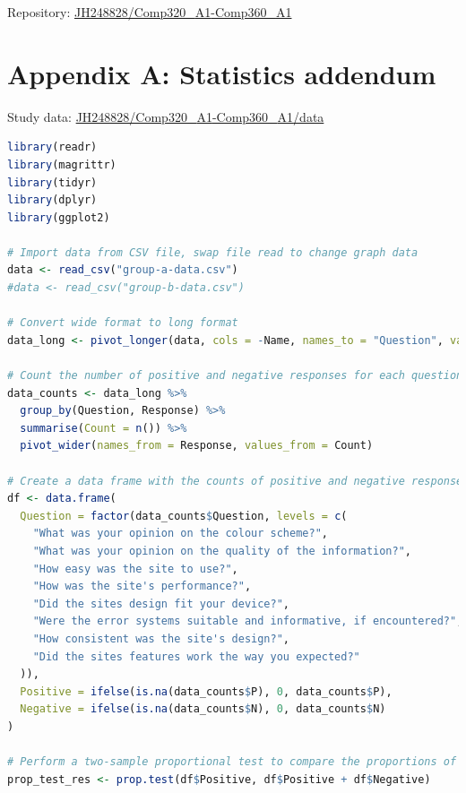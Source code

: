 \documentclass[article]{IEEEtran}
\begin{document}
    \appendix
        Repository: \href{https://github.falmouth.ac.uk/JH248828/Comp320_A1-Comp360_A1}{JH248828/Comp320\_{A1}-Comp360\_{A1}} \\

        \section*{Appendix A: Statistics addendum}
            \label{tab:study-data}
            Study data: \href{https://github.falmouth.ac.uk/JH248828/Comp320_A1-Comp360_A1/tree/documentation/data}{JH248828/Comp320\_{A1}-Comp360\_{A1}/data} \\
        
            \begin{lstlisting}[style=rListingStyle, language=R, caption={R-code used to create column graphs}, captionpos=t]
library(readr)
library(magrittr)
library(tidyr)
library(dplyr)
library(ggplot2)

# Import data from CSV file, swap file read to change graph data
data <- read_csv("group-a-data.csv")
#data <- read_csv("group-b-data.csv")

# Convert wide format to long format
data_long <- pivot_longer(data, cols = -Name, names_to = "Question", values_to = "Response")

# Count the number of positive and negative responses for each question
data_counts <- data_long %>%
  group_by(Question, Response) %>%
  summarise(Count = n()) %>%
  pivot_wider(names_from = Response, values_from = Count)

# Create a data frame with the counts of positive and negative responses for each question
df <- data.frame(
  Question = factor(data_counts$Question, levels = c(
    "What was your opinion on the colour scheme?",
    "What was your opinion on the quality of the information?",
    "How easy was the site to use?",
    "How was the site's performance?",
    "Did the sites design fit your device?",
    "Were the error systems suitable and informative, if encountered?",
    "How consistent was the site's design?",
    "Did the sites features work the way you expected?"
  )),
  Positive = ifelse(is.na(data_counts$P), 0, data_counts$P),
  Negative = ifelse(is.na(data_counts$N), 0, data_counts$N)
)

# Perform a two-sample proportional test to compare the proportions of positive and negative responses between each question
prop_test_res <- prop.test(df$Positive, df$Positive + df$Negative)


\end{lstlisting}
\end{document}
